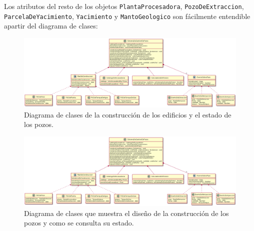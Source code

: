 Los atributos del resto de los objetos \texttt{PlantaProcesadora}, \texttt{PozoDeExtraccion}, \texttt{ParcelaDeYacimiento}, \texttt{Yacimiento} y \texttt{MantoGeologico} son f\'acilmente entendible apartir del diagrama de clases:

\begin{figure}[H]
  \centering
  \hspace{-3.5cm}\includegraphics[angle=90,scale=0.4]{Partes/Imagenes/diagrama_alternativo1.png}
    \caption{Diagrama de clases de la construcción de los edificios y el estado de los pozos.}
    \label{fig:dia_cla_gestion_1_1}
\end{figure}

\begin{figure}[H]
  \centering
  \hspace{-3.5cm}\includegraphics[angle=90,scale=0.35]{Partes/Imagenes/diagrama_alternativo1.png}
    \caption{Diagrama de clases que muestra el diseño de la construcción de los pozos y como se consulta su estado.}
    \label{fig:dia_cla_const_1_1}
\end{figure}
